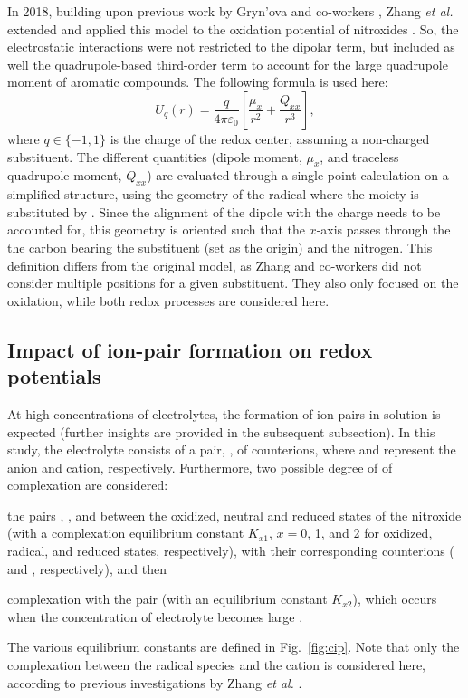 \documentclass[review,preprint]{elsarticle}
\begin{document}
In 2018, building upon previous work by Gryn'ova and co-workers \cite{grynovaOriginScopeLongRange2013,grynovaSwitchingRadicalStability2013}, Zhang \textit{et al.} extended and applied this model to the oxidation potential of nitroxides \cite{zhangEffectHeteroatomFunctionality2018}. So, the electrostatic interactions were not restricted to the dipolar term, but included as well the quadrupole-based third-order term to account for the large quadrupole moment of aromatic compounds. The following formula is used here:
\begin{equation}
	U_q(r) =\frac{q}{4\pi\varepsilon_0} \left[\frac{\mu_x}{r^2} + \frac{Q_{xx}}{r^3}\right], \label{eq:Er}
\end{equation}
where $q \in \{-1, 1\}$ is the charge of the redox center, assuming a non-charged substituent. The different quantities (dipole moment, $\mu_x$, and traceless quadrupole moment, $Q_{xx}$) are evaluated through a single-point calculation on a simplified structure, using the geometry of the radical where the  moiety is substituted by . Since the alignment of the dipole with the charge needs to be accounted for, this geometry is oriented such that the $x$-axis passes through the the carbon bearing the substituent (set as the origin) and the nitrogen. This definition differs from the original model, as Zhang and co-workers \cite{zhangEffectHeteroatomFunctionality2018} did not consider multiple positions for a given substituent. They also only focused on the oxidation, while both redox processes are considered here.


\subsection{Impact of ion-pair formation on redox potentials}

At high concentrations of electrolytes, the formation of ion pairs in solution is expected (further insights are provided in the subsequent subsection). In this study, the electrolyte consists of a pair, , of counterions, where  and  represent the anion and cation, respectively. Furthermore, two possible degree of of complexation are considered: \begin{inparaenum}[(i)]
	\item the pairs , , and  between the oxidized, neutral and reduced states of the nitroxide  (with a complexation equilibrium constant $K_{x1}$, $x=0$, 1, and 2 for oxidized, radical, and reduced states, respectively), with their corresponding counterions ( and , respectively), and then
	\item complexation with the  pair (with an equilibrium constant $K_{x2}$), which occurs when the concentration of electrolyte becomes large \cite{wylieImprovedPerformanceAllOrganic2019a}.
\end{inparaenum}
The various equilibrium constants are defined in Fig.~\ref{fig:cip}. Note that only the complexation between the radical species and the cation is considered here, according to previous investigations by Zhang \textit{et al.} \cite{zhangInteractionsImidazoliumBasedIonic2016,zhangEffectHeteroatomFunctionality2018}.
\end{document}
